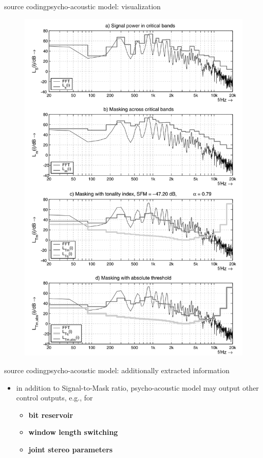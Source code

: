 \begin{frame}{source coding}{psycho-acoustic model: visualization}
\begin{figure}
					\includegraphics[scale=0.2]{Graph/psychomodeloutput}
			\end{figure}
	\end{frame}
	
	\begin{frame}{source coding}{psycho-acoustic model: additionally extracted information}
        \begin{itemize}
            \item   in addition to Signal-to-Mask ratio, psycho-acoustic model may output other control outputs, e.g., for
                \begin{itemize}
                    \item   \textbf{bit reservoir} 
                    \smallskip
                    \item \textbf{window length switching}
                    \smallskip
                    \item   \textbf{joint stereo parameters}
                \end{itemize}
        \end{itemize}
	\end{frame}
